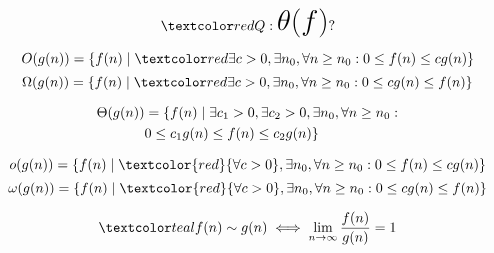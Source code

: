
\begin{frame}{}
  \centerline{}
  \vspace{-0.30cm}

  \pause
  \vspace{-0.30cm}
  \[
    \red{Q: \text{\huge $\theta(f)$}?}
  \]
\end{frame}

\begin{frame}{}
  \[
    O(g(n)) = \set{f(n) \mid \red{\exists} c > 0, \exists n_0, \forall n \ge n_0: 0 \le f(n) \le c g(n)}
  \]
  \[
    \Omega(g(n)) = \set{f(n) \mid \red{\exists} c > 0, \exists n_0, \forall n \ge n_0: 0 \le c g(n) \le f(n)}
  \]

  \pause
  \begin{align*}
    \Theta(g(n)) &= \{f(n) \mid \exists c_1 > 0, \exists c_2 >0, \exists n_0, \forall n \ge n_0: \\ 
		& 0 \le c_1 g(n) \le f(n) \le c_2 g(n)\}
  \end{align*}

  \pause
  \[
    o(g(n)) = \set{f(n) \mid \textcolor{red}{\forall c > 0}, \exists n_0, \forall n \ge n_0: 0 \le f(n) \le c g(n)}
  \]
  \[
    \omega(g(n)) = \set{f(n) \mid \textcolor{red}{\forall c > 0}, \exists n_0, \forall n \ge n_0: 0 \le c g(n) \le f(n)}
  \]

  \pause
  \[
    \teal{f(n) \sim g(n) \iff \lim_{n \to \infty} \frac{f(n)}{g(n)} = 1}
  \]
\end{frame}

